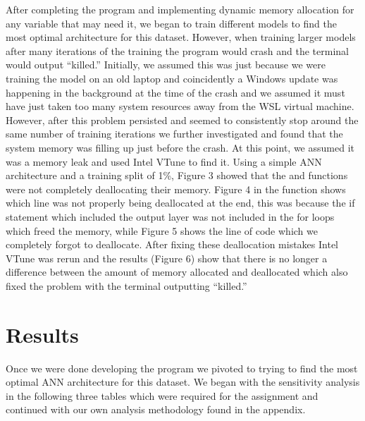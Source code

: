 \documentclass[12pt]{article}
\begin{document}
After completing the program and implementing dynamic memory allocation for any variable that may need it, we began to train different models to find the most optimal architecture for this dataset. However, when training larger models after many iterations of the training the program would crash and the terminal would output “killed.” Initially, we assumed this was just because we were training the model on an old laptop and coincidently a Windows update was happening in the background at the time of the crash and we assumed it must have just taken too many system resources away from the WSL virtual machine. However, after this problem persisted and seemed to consistently stop around the same number of training iterations we further investigated and found that the system memory was filling up just before the crash. At this point, we assumed it was a memory leak and used Intel VTune to find it. Using a simple ANN architecture and a training split of 1\%, Figure 3 showed that the  and  functions were not completely deallocating their memory. Figure 4 in the  function shows which line was not properly being deallocated at the end, this was because the if statement which included the output layer was not included in the for loops which freed the memory, while Figure 5 shows the line of code which we completely forgot to deallocate. After fixing these deallocation mistakes Intel VTune was rerun and the results (Figure 6) show that there is no longer a difference between the amount of memory allocated and deallocated which also fixed the problem with the terminal outputting “killed.” 

\section{Results}

Once we were done developing the program we pivoted to trying to find the most optimal ANN architecture for this dataset. We began with the sensitivity analysis in the following three tables which were required for the assignment and continued with our own analysis methodology found in the appendix. 
\end{document}
